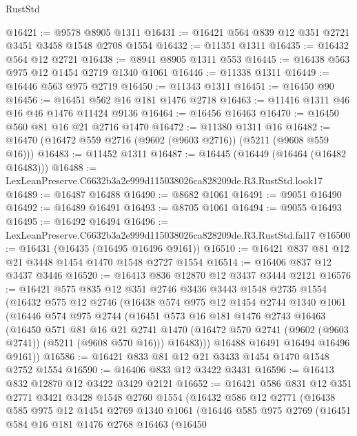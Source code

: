 \begin{lexlean}{RustStd}
\begin{coremodule}
@16421 := @9578 @8905 @1311
@16431 := @16421 @564 @839 @12 @351 @2721 @3451 @3458 @1548 @2708 @1554
@16432 := @11351 @1311
@16435 := @16432 @564 @12 @2721
@16438 := @8941 @8905 @1311 @553
@16445 := @16438 @563 @975 @12 @1454 @2719 @1340 @1061
@16446 := @11338 @1311
@16449 := @16446 @563 @975 @2719
@16450 := @11343 @1311
@16451 := @16450 @90
@16456 := @16451 @562 @16 @181 @1476 @2718
@16463 := @11416 @1311 @46 @16 @46 @1476 @11424 @9136
@16464 := @16456 @16463
@16470 := @16450 @560 @81 @16 @21 @2716 @1470
@16472 := @11380 @1311 @16
@16482 := @16470 (@16472 @559 @2716 (@9602 (@9603 @2716)) (@5211 (@9608 @559 @16)))
@16483 := @11452 @1311
@16487 := @16445 (@16449 (@16464 (@16482 @16483)))
@16488 := LexLeanPreserve.C6632b3a2e999d115038026ca828209de.R3.RustStd.look17
@16489 := @16487 @16488
@16490 := @8682 @1061
@16491 := @9051 @16490
@16492 := @16489 @16491
@16493 := @8705 @1061
@16494 := @9055 @16493
@16495 := @16492 @16494
@16496 := LexLeanPreserve.C6632b3a2e999d115038026ca828209de.R3.RustStd.fal17
@16500 := @16431 (@16435 (@16495 @16496 @9161))
@16510 := @16421 @837 @81 @12 @21 @3448 @1454 @1470 @1548 @2727 @1554
@16514 := @16406 @837 @12 @3437 @3446
@16520 := @16413 @836 @12870 @12 @3437 @3444 @2121
@16576 := @16421
    @575
    @835
    @12
    @351
    @2746
    @3436
    @3443
    @1548
    @2735
    @1554
    (@16432
      @575
      @12
      @2746
      (@16438
        @574
        @975
        @12
        @1454
        @2744
        @1340
        @1061
        (@16446
          @574
          @975
          @2744
          (@16451
            @573
            @16
            @181
            @1476
            @2743
            @16463
            (@16450
              @571
              @81
              @16
              @21
              @2741
              @1470
              (@16472 @570 @2741 (@9602 (@9603 @2741)) (@5211 (@9608 @570 @16)))
              @16483)))
        @16488
        @16491
        @16494
        @16496
        @9161))
@16586 := @16421 @833 @81 @12 @21 @3433 @1454 @1470 @1548 @2752 @1554
@16590 := @16406 @833 @12 @3422 @3431
@16596 := @16413 @832 @12870 @12 @3422 @3429 @2121
@16652 := @16421
    @586
    @831
    @12
    @351
    @2771
    @3421
    @3428
    @1548
    @2760
    @1554
    (@16432
      @586
      @12
      @2771
      (@16438
        @585
        @975
        @12
        @1454
        @2769
        @1340
        @1061
        (@16446
          @585
          @975
          @2769
          (@16451
            @584
            @16
            @181
            @1476
            @2768
            @16463
            (@16450

\end{coremodule}
\end{lexlean}

